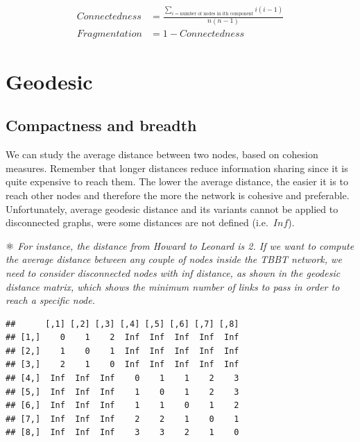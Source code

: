 \documentclass[
  notitlepage,
  onecolumn,
  openany]{book}
\newenvironment{Shaded}{\begin{snugshade}}{\end{snugshade}}
\newcommand{\FunctionTok}[1]{\textcolor[rgb]{0.00,0.00,0.00}{#1}}
\newcommand{\NormalTok}[1]{#1}
\newcommand{\SpecialCharTok}[1]{\textcolor[rgb]{0.00,0.00,0.00}{#1}}
\begin{document}
\[
\begin{aligned}
Connectedness &= \frac{\sum_{i = \text{number of nodes in ith component}} i(i-1)}{n(n-1)} \\
Fragmentation &= 1- Connectedness
\end{aligned}
\]

\hypertarget{geodesic}{%
\section{Geodesic}\label{geodesic}}

\hypertarget{compactness-and-breadth}{%
\subsection{Compactness and breadth}\label{compactness-and-breadth}}

We can study the average distance between two nodes, based on cohesion measures. Remember that longer distances reduce information sharing since it is quite expensive to reach them. The lower the average distance, the easier it is to reach other nodes and therefore the more the network is cohesive and preferable.\\
Unfortunately, average geodesic distance and its variants cannot be applied to disconnected graphs, were some distances are not defined (i.e.~\(Inf\)).

⚛️ \emph{For instance, the distance from Howard to Leonard is 2. If we want to compute the average distance between any couple of nodes inside the TBBT network, we need to consider disconnected nodes with inf distance, as shown in the geodesic distance matrix, which shows the minimum number of links to pass in order to reach a specific node.}

\begin{Shaded}
\end{Shaded}

\begin{verbatim}
##      [,1] [,2] [,3] [,4] [,5] [,6] [,7] [,8]
## [1,]    0    1    2  Inf  Inf  Inf  Inf  Inf
## [2,]    1    0    1  Inf  Inf  Inf  Inf  Inf
## [3,]    2    1    0  Inf  Inf  Inf  Inf  Inf
## [4,]  Inf  Inf  Inf    0    1    1    2    3
## [5,]  Inf  Inf  Inf    1    0    1    2    3
## [6,]  Inf  Inf  Inf    1    1    0    1    2
## [7,]  Inf  Inf  Inf    2    2    1    0    1
## [8,]  Inf  Inf  Inf    3    3    2    1    0
\end{verbatim}
\end{document}
